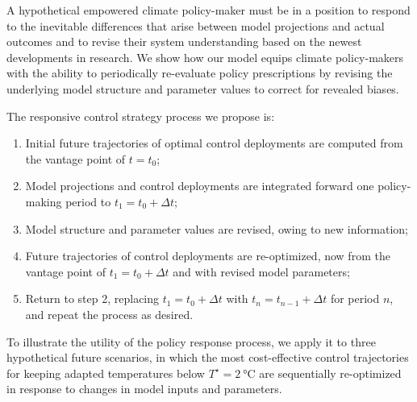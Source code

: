 \documentclass{article}
\begin{document}

A hypothetical empowered climate policy-maker must be in a position to respond to the inevitable differences that arise between model projections and actual outcomes and to revise their system understanding based on the newest developments in research. We show how our model equips climate policy-makers with the ability to periodically re-evaluate policy prescriptions by revising the underlying model structure and parameter values to correct for revealed biases.

The responsive control strategy process we propose is:
\begin{enumerate}
    \item Initial future trajectories of optimal control deployments are computed from the vantage point of $t=t_{0}$;
    \item Model projections and control deployments are integrated forward one policy-making period to $t_{1}=t_{0} + \Delta t$;
    \item Model structure and parameter values are revised, owing to new information;
    \item Future trajectories of control deployments are re-optimized, now from the vantage point of $t_{1}=t_{0}+\Delta t$ and with revised model parameters;
    \item Return to step 2, replacing $t_{1} = t_{0} + \Delta t$ with $t_{n} = t_{n-1}+\Delta t$ for period $n$, and repeat the process as desired.
\end{enumerate}

To illustrate the utility of the policy response process, we apply it to three hypothetical future scenarios, in which the most cost-effective control trajectories for keeping adapted temperatures below $T^{\star} = \SI{2}{\celsius}$ are sequentially re-optimized in response to changes in model inputs and parameters.

\end{document}
